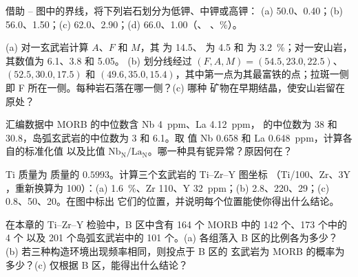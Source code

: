 \begin{exercise}[$\star$]\label{exo:b2:magmatic-series:4}
借助 -- 图中的界线，将下列岩石划分为低钾、中钾或高钾：
(a) 50.0、0.40；(b) 56.0、1.50；(c) 62.0、2.90；(d) 66.0、1.00（、
、\unit{\percent}）。
\end{exercise}

\begin{exercise}[$\star\star$]\label{exo:b2:magmatic-series:5}
(a) 对一玄武岩计算 $A$、$F$ 和 $M$，其  为 14.5、 为 4.5 和
 为 \qty{3.2}{\percent}；对一安山岩，其数值为 6.1、3.8 和 5.05。
(b) 划分线经过 $(F, A, M) = (54.5, 23.0, 22.5)$、$(52.5, 30.0,
17.5)$ 和 $(49.6, 35.0, 15.4)$，其中第一点为其最富铁的点；拉斑一侧
即 F 所在一侧。每种岩石落在哪一侧？(c) 哪种
矿物在早期结晶，使安山岩留在原处？
\end{exercise}

\begin{exercise}[$\star\star$]\label{exo:b2:magmatic-series:6}
汇编数据中 MORB 的中位数含 Nb \qty{4}{ppm}、La \qty{4.12}{ppm}，
的中位数为 38 和 30.8，岛弧玄武岩的中位数为 3 和 6.1。取
值 Nb 0.658 和 La \qty{0.648}{ppm}，计算各自的标准化值
以及比值 $\mathrm{Nb_N}/\mathrm{La_N}$。哪一种具有铌异常？原因何在？
\end{exercise}

\begin{exercise}[$\star\star$]\label{exo:b2:magmatic-series:7}
Ti 质量为  质量的 $0.5993$。计算三个玄武岩的 Ti--Zr--Y 图坐标
（Ti/100、Zr、$3\mathrm Y$，重新换算为 100）：(a) 
\qty{1.6}{\percent}、Zr 110、Y \qty{32}{ppm}；(b) 2.8、220、29；(c) 0.8、50、20。在图中标出
它们的位置，并说明每个位置能使你得出什么结论。
\end{exercise}

\begin{exercise}[$\star\star$]\label{exo:b2:magmatic-series:8}
在本章的 Ti--Zr--Y 检验中，B 区中含有 164 个 MORB 中的 142 个、173 个中的 4 个
以及 201 个岛弧玄武岩中的 101 个。(a) 各组落入 B 区的比例各为多少？
(b) 若三种构造环境出现频率相同，则投点于 B 区的
玄武岩为 MORB 的概率为多少？(c) 仅根据 B 区，能得出什么结论？
\end{exercise}

